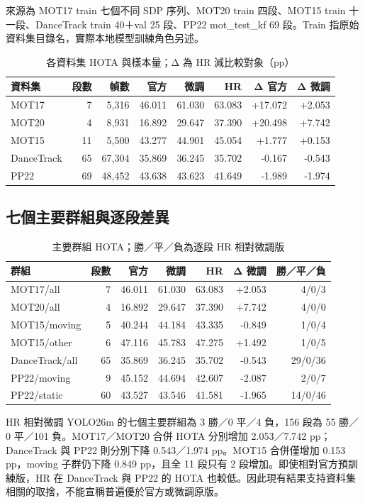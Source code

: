 來源為 MOT17 train 七個不同 SDP 序列、MOT20 train 四段、MOT15 train 十一段、DanceTrack train 40＋val 25 段、PP22 mot\_test\_kf 69 段。Train 指原始資料集目錄名，實際本地模型訓練角色另述。
\begin{table}[H]
\caption{各資料集 HOTA 與樣本量；Δ 為 HR 減比較對象（pp）}
\small
\noindent\begin{tabularx}{\textwidth}{@{}Yrrrrrrr@{}}
\toprule
資料集 & 段數 & 幀數 & 官方 & 微調 & HR & Δ 官方 & Δ 微調 \\
\midrule
MOT17 & 7 & 5,316 & 46.011 & 61.030 & 63.083 & +17.072 & +2.053 \\
MOT20 & 4 & 8,931 & 16.892 & 29.647 & 37.390 & +20.498 & +7.742 \\
MOT15 & 11 & 5,500 & 43.277 & 44.901 & 45.054 & +1.777 & +0.153 \\
DanceTrack & 65 & 67,304 & 35.869 & 36.245 & 35.702 & -0.167 & -0.543 \\
PP22 & 69 & 48,452 & 43.638 & 43.623 & 41.649 & -1.989 & -1.974 \\
\bottomrule
\end{tabularx}
\end{table}
\subsection{七個主要群組與逐段差異}
\begin{table}[H]
\caption{主要群組 HOTA；勝／平／負為逐段 HR 相對微調版}
\small
\noindent\begin{tabularx}{\textwidth}{@{}Yrrrrrr@{}}
\toprule
群組 & 段數 & 官方 & 微調 & HR & Δ 微調 & 勝／平／負 \\
\midrule
MOT17/all & 7 & 46.011 & 61.030 & 63.083 & +2.053 & 4/0/3 \\
MOT20/all & 4 & 16.892 & 29.647 & 37.390 & +7.742 & 4/0/0 \\
MOT15/moving & 5 & 40.244 & 44.184 & 43.335 & -0.849 & 1/0/4 \\
MOT15/other & 6 & 47.116 & 45.783 & 47.275 & +1.492 & 1/0/5 \\
DanceTrack/all & 65 & 35.869 & 36.245 & 35.702 & -0.543 & 29/0/36 \\
PP22/moving & 9 & 45.152 & 44.694 & 42.607 & -2.087 & 2/0/7 \\
PP22/static & 60 & 43.527 & 43.546 & 41.581 & -1.965 & 14/0/46 \\
\bottomrule
\end{tabularx}
\end{table}
HR 相對微調 YOLO26m 的七個主要群組為 3 勝／0 平／4 負，156 段為 55 勝／0 平／101 負。MOT17／MOT20 合併 HOTA 分別增加 2.053／7.742 pp；DanceTrack 與 PP22 則分別下降 0.543／1.974 pp。MOT15 合併僅增加 0.153 pp，moving 子群仍下降 0.849 pp，且全 11 段只有 2 段增加。即使相對官方預訓練版，HR 在 DanceTrack 與 PP22 的 HOTA 也較低。因此現有結果支持資料集相關的取捨，不能宣稱普遍優於官方或微調原版。

